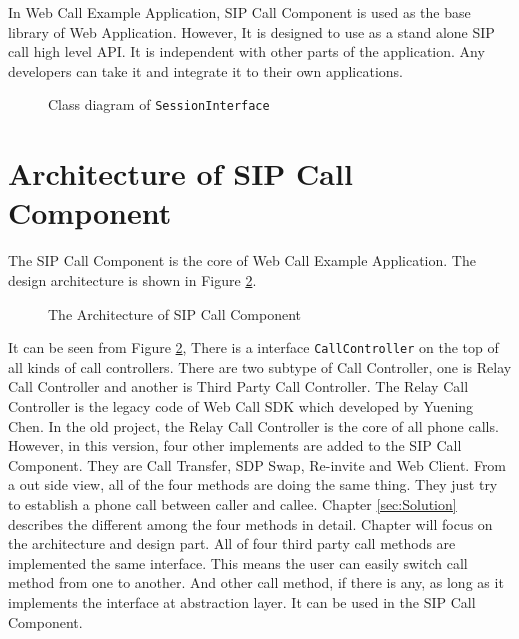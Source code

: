 In Web Call Example Application, SIP Call Component is used as the base library of Web Application. However, It is designed to use as a stand alone SIP call high level API. It is independent with other parts of the application. Any developers can take it and integrate it to their own applications.


\begin{figure}[!hbtp]
\centering
{}
\caption{Class diagram of \texttt{SessionInterface}}
\label{fig:ClassDiagramOfSessionInterface}
\end{figure}



\section{Architecture of SIP Call Component}

The SIP Call Component is the core of Web Call Example Application. The design architecture is shown in Figure \ref{fig:TheArchitectureOfSIPCallComponent}.

\begin{figure}[!hbtp]
\centering
{}
\caption{The Architecture of SIP Call Component}
\label{fig:TheArchitectureOfSIPCallComponent}
\end{figure}

It can be seen from Figure \ref{fig:TheArchitectureOfSIPCallComponent}, There is a interface \texttt{CallController} on the top of all kinds of call controllers. There are two subtype of Call Controller, one is Relay Call Controller and another is Third Party Call Controller. The Relay Call Controller is the legacy code of \textsf{Web Call SDK} which developed by Yuening Chen. In the old project, the Relay Call Controller is the core of all phone calls\cite{WebCallSDK}. However, in this version, four other implements are added to the SIP Call Component. They are Call Transfer, SDP Swap, Re-invite and Web Client. From a out side view, all of the four methods are doing the same thing. They just try to establish a phone call between caller and callee. Chapter \ref{sec:Solution} describes the different among the four methods in detail. Chapter will focus on the architecture and design part. All of four third party call methods are implemented the same interface. This means the user can easily switch call method from one to another. And other call method, if there is any, as long as it implements the interface at abstraction layer. It can be used in the SIP Call Component.





